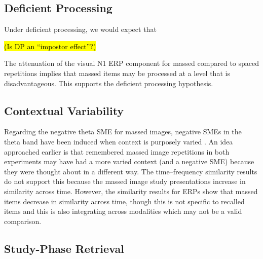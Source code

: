 \subsection{Deficient Processing}

Under deficient processing, we would expect that

\hl{(Is DP an ``impostor effect''?)}

The attenuation of the visual N1 ERP component for massed compared to spaced repetitions implies that massed items may be processed at a level that is disadvantageous.  This supports the deficient processing hypothesis.



\subsection{Contextual Variability}




Regarding the negative theta SME for massed images, negative SMEs in the theta band have been induced when context is purposely varied \cite{StauHans2013}.  An idea approached earlier is that remembered massed image repetitions in both experiments may have had a more varied context (and a negative SME) because they were thought about in a different way.  The time--frequency similarity results do not support this because the massed image study presentations increase in similarity across time.  However, the similarity results for ERPs show that massed items decrease in similarity across time, though this is not specific to recalled items and this is also integrating across modalities which may not be a valid comparison.

\subsection{Study-Phase Retrieval}


